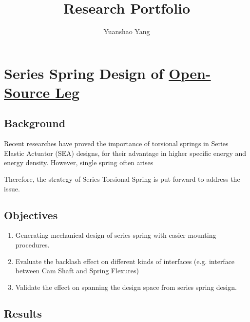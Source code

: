 \documentclass[12pt]{article}
\title{Research Portfolio}
\author{Yuanshao Yang}
\begin{document}
\maketitle


\tableofcontents
\newpage

\section{Series Spring Design of \href{https://www.opensourceleg.org/}{Open-Source Leg}}

\subsection{Background}


Recent researches have proved the importance of torsional springs in Series Elastic Actuator (SEA) designs, for their advantage in higher specific energy and energy density. However, single spring often arises 


Therefore, the strategy of Series Torsional Spring is put forward to address the issue. 




\subsection{Objectives}

\begin{enumerate}

    \item {Generating mechanical design of series spring with easier mounting procedures.}
    \item {Evaluate the backlash effect on different kinds of interfaces (e.g. interface between Cam Shaft and Spring Flexures)}
    \item {Validate the effect on spanning the design space from series spring design.}

\end{enumerate}

\subsection{Results}
\end{document}
